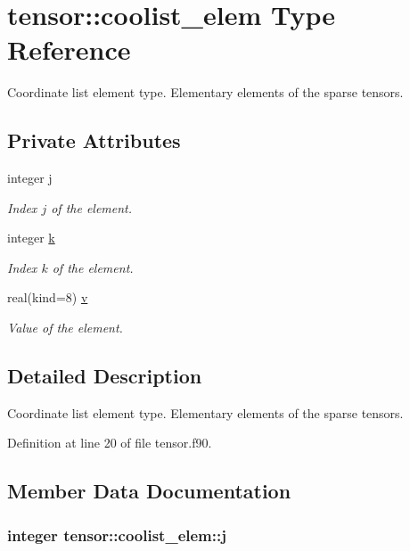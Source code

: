 \hypertarget{structtensor_1_1coolist__elem}{\section{tensor\-:\-:coolist\-\_\-elem Type Reference}
\label{structtensor_1_1coolist__elem}
}


Coordinate list element type. Elementary elements of the sparse tensors.  


\subsection*{Private Attributes}
\begin{DoxyCompactItemize}
\item 
integer \hyperlink{structtensor_1_1coolist__elem_a0ed51fd9ddc1c2168d8c138eb5da5f66}{j}
\begin{DoxyCompactList}\small\item\em Index $j$ of the element. \end{DoxyCompactList}\item 
integer \hyperlink{structtensor_1_1coolist__elem_a368c80ca537d7c5d6e1fbba8a85dec38}{k}
\begin{DoxyCompactList}\small\item\em Index $k$ of the element. \end{DoxyCompactList}\item 
real(kind=8) \hyperlink{structtensor_1_1coolist__elem_ac569057f08f5f8ea171b87aa7b9dd428}{v}
\begin{DoxyCompactList}\small\item\em Value of the element. \end{DoxyCompactList}\end{DoxyCompactItemize}


\subsection{Detailed Description}
Coordinate list element type. Elementary elements of the sparse tensors. 

Definition at line 20 of file tensor.\-f90.



\subsection{Member Data Documentation}
\hypertarget{structtensor_1_1coolist__elem_a0ed51fd9ddc1c2168d8c138eb5da5f66}{
\subsubsection[{j}]{\setlength{\rightskip}{0pt plus 5cm}integer tensor\-::coolist\-\_\-elem\-::j\hspace{0.3cm}{\ttfamily [private]}}}\label{structtensor_1_1coolist__elem_a0ed51fd9ddc1c2168d8c138eb5da5f66}


